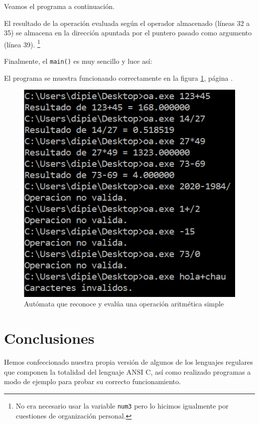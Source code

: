 \documentclass[a4paper, 12pt]{article}
\begin{document}
Veamos el programa a continuación.



El resultado de la operación evaluada según el operador almacenado (líneas 32 a 35) se almacena en la dirección apuntada por el puntero pasado como argumento (línea 39). \footnote{No era necesario usar la variable \texttt{num3} pero lo hicimos igualmente por cuestiones de organización personal.}

Finalmente, el \texttt{main()} es muy sencillo y luce así:



El programa se muestra funcionando correctamente en la figura \ref{fig:aritmetica-consola}, página \pageref{fig:aritmetica-consola}.

\begin{figure}[b]
    \centering
    \includegraphics{images/operacionesAritmeticas.PNG}
    \caption{Autómata que reconoce y evalúa una operación aritmética simple}
    \label{fig:aritmetica-consola}
\end{figure}

\section{Conclusiones}
\label{conclusiones}

Hemos confeccionado nuestra propia versión de algunos de los lenguajes regulares que componen la totalidad del lenguaje ANSI C, así como realizado programas a modo de ejemplo para probar su correcto funcionamiento.
\end{document}
